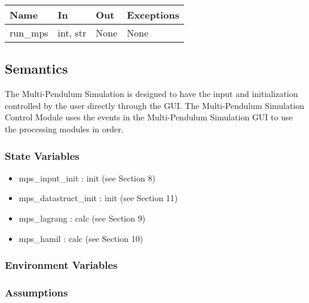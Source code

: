 \documentclass[12pt, titlepage]{article}
\newcommand{\progname}{Multi-Pendulum Simulation }
\begin{document}
\begin{center}
\begin{tabular}{p{2cm} p{4cm} p{4cm} p{2cm}}
\hline
\textbf{Name} & \textbf{In} & \textbf{Out} & \textbf{Exceptions} \\
\hline
run\_mps & int, str & None & None \\
\hline
\end{tabular}
\end{center}

\subsection{Semantics}

The \progname is designed to have the input and initialization controlled by the user directly through the GUI.
The \progname Control Module uses the events in the \progname GUI to use the processing modules in order.

\subsubsection{State Variables}

\begin{itemize}
	\item mps\_input\_init : init (see Section 8)
	\item mps\_datastruct\_init : init (see Section 11)
	\item mps\_lagrang : calc (see Section 9)
	\item mps\_hamil : calc (see Section 10)
\end{itemize}

\subsubsection{Environment Variables}


\subsubsection{Assumptions}

\end{document}
